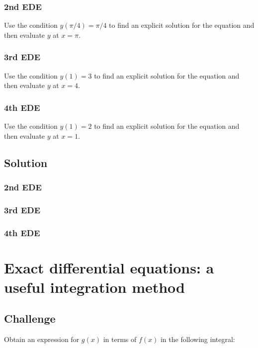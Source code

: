 \subsubsection{2nd EDE}
Use the condition $y(\pi/4)=\pi/4$ to find an explicit solution for the equation and then evaluate $y$ at $x=\pi$.

\subsubsection{3rd EDE}
Use the condition $y(1)=3$ to find an explicit solution for the equation and then evaluate $y$ at $x=4$.

\subsubsection{4th EDE}
Use the condition $y(1)=2$ to find an explicit solution for the equation and then evaluate $y$ at $x=1$.


\subsection*{Solution}

\subsubsection{2nd EDE}
\six{}


\subsubsection{3rd EDE}
\six{}


\subsubsection{4th EDE}
\six{}


\timebox




\newpage
\section{Exact differential equations: a useful integration method}

\subsection*{Challenge}
Obtain an expression for $g(x)$ in terms of $f(x)$ in the following integral:

